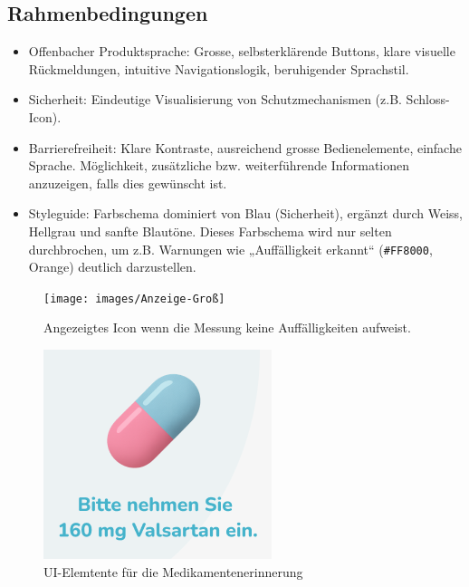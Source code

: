 \vspace{1em}

\subsection{Rahmenbedingungen}
\begin{itemize}
	\item Offenbacher Produktsprache: Grosse, selbsterklärende Buttons, klare visuelle Rückmeldungen, intuitive Navigationslogik, beruhigender Sprachstil.
	\item Sicherheit: Eindeutige Visualisierung von Schutzmechanismen (z.B. Schloss-Icon).
	\item Barrierefreiheit: Klare Kontraste, ausreichend grosse Bedienelemente, einfache Sprache. Möglichkeit, zusätzliche bzw. weiterführende Informationen anzuzeigen, falls dies gewünscht ist.
	\item Styleguide: Farbschema dominiert von Blau (Sicherheit), ergänzt durch Weiss, Hellgrau und sanfte Blautöne. Dieses Farbschema wird nur selten durchbrochen, um z.B. Warnungen wie „Auffälligkeit erkannt“ (\texttt{\#FF8000}, Orange) deutlich darzustellen.
\end{itemize}

\vspace{1em}

\begin{figure}[h!]
	\centering
	\begin{minipage}{0.3\linewidth}
		\centering
		\texttt{[image: images/Anzeige-Groß]}
		\caption{Angezeigtes Icon wenn die Messung keine Auffälligkeiten aufweist.}
		\label{fig:anzeige-gros}
	\end{minipage}
	\hfill
	\begin{minipage}{0.35\linewidth}
		\centering
		\includegraphics[width=\linewidth]{images/Einnahme}
		\caption{UI-Elemtente für die Medikamentenerinnerung}
		\label{fig:einnahme}
	\end{minipage}
\end{figure}

\newpage